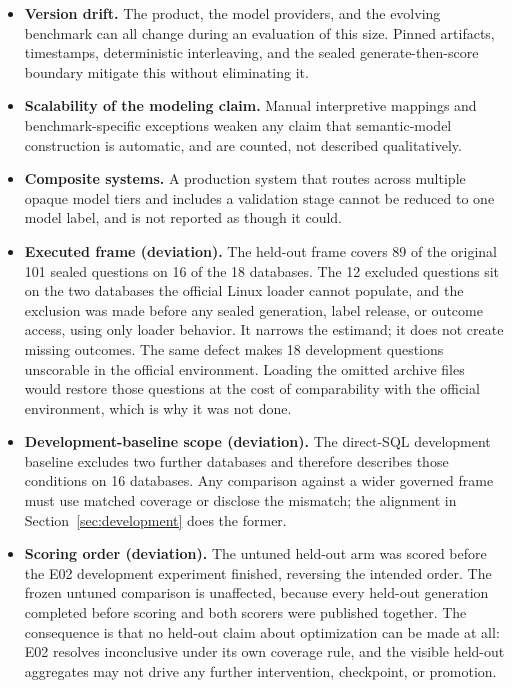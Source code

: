 \begin{itemize}[leftmargin=1.2em]
  every run.
  \item \textbf{Version drift.} The product, the model providers, and the
  evolving benchmark can all change during an evaluation of this size. Pinned
  artifacts, timestamps, deterministic interleaving, and the sealed
  generate-then-score boundary mitigate this without eliminating it.
  \item \textbf{Scalability of the modeling claim.} Manual interpretive mappings
  and benchmark-specific exceptions weaken any claim that semantic-model
  construction is automatic, and are counted, not described qualitatively.
  \item \textbf{Composite systems.} A production system that routes across
  multiple opaque model tiers and includes a validation stage cannot be reduced to
  one model label, and is not reported as though it could.
  \item \textbf{Executed frame (deviation).} The held-out frame covers 89 of the
  original 101 sealed questions on 16 of the 18 databases. The 12 excluded
  questions sit on the two databases the official Linux loader cannot populate,
  and the exclusion was made before any sealed generation, label release, or
  outcome access, using only loader behavior. It narrows the estimand; it does
  not create missing outcomes. The same defect makes 18 development questions
  unscorable in the official environment. Loading the omitted archive files would
  restore those questions at the cost of comparability with the official
  environment, which is why it was not done.
  \item \textbf{Development-baseline scope (deviation).} The direct-SQL
  development baseline excludes two further databases and therefore describes
  those conditions on 16 databases. Any comparison against a wider governed frame
  must use matched coverage or disclose the mismatch; the alignment in
  Section~\ref{sec:development} does the former.
  \item \textbf{Scoring order (deviation).} The untuned held-out arm was scored
  before the E02 development experiment finished, reversing the intended order.
  The frozen untuned comparison is unaffected, because every held-out generation
  completed before scoring and both scorers were published together. The
  consequence is that no held-out claim about optimization can be made at all:
  E02 resolves inconclusive under its own coverage rule, and the visible held-out
  aggregates may not drive any further intervention, checkpoint, or promotion.
\end{itemize}
